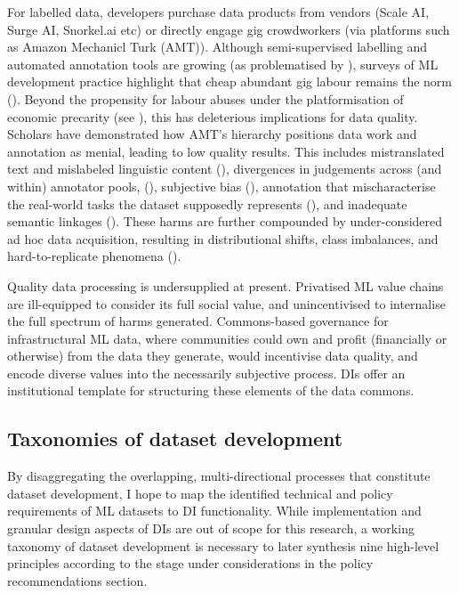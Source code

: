 For labelled data, developers purchase data products from vendors (Scale AI, Surge AI, Snorkel.ai etc) or directly engage gig crowdworkers (via platforms such as Amazon Mechanicl Turk (AMT)). Although semi-supervised labelling and automated annotation tools are growing (as problematised by \textcite{jarrahi2023PrinciplesDataCentricAI}), surveys of ML development practice highlight that cheap abundant gig labour remains the norm (\cite{priestley2023SurveyDataQuality}). Beyond the propensity for labour abuses under the platformisation of economic precarity (see \textcite{miceli2020SubjectivityImpositionPower}), this has deleterious implications for data quality. Scholars have demonstrated how AMT’s hierarchy positions data work and annotation as menial, leading to low quality results. This includes mistranslated text and mislabeled linguistic content (\cite{kreutzer2022QualityGlanceAudit, miceli2020SubjectivityImpositionPower}), divergences in judgements across (and within) annotator pools, (\cite{dixon2018MeasuringMitigatingUnintended, kreutzer2022QualityGlanceAudit}), subjective bias (\cite{ghai2020MeasuringSocialBiases, hube2019UnderstandingMitigatingWorker}), annotation that mischaracterise the real-world tasks the dataset supposedly represents (\cite{dixon2018MeasuringMitigatingUnintended}), and inadequate semantic linkages (\cite{WTFKnowledgeGraph}). These harms are further compounded by under-considered ad hoc data acquisition, resulting in distributional shifts, class imbalances, and hard-to-replicate phenomena (\cite{jarrahi2023PrinciplesDataCentricAI}).

Quality data processing is undersupplied at present. Privatised ML value chains are ill-equipped to consider its full social value, and unincentivised to internalise the full spectrum of harms generated. Commons-based governance for infrastructural ML data, where communities could own and profit (financially or otherwise) from the data they generate, would incentivise data quality, and encode diverse values into the necessarily subjective process. DIs offer an institutional template for structuring these elements of the data commons.

\subsection*{Taxonomies of dataset development}

By disaggregating the overlapping, multi-directional processes that constitute dataset development, I hope to map the identified technical and policy requirements of ML datasets to DI functionality. While implementation and granular design aspects of DIs are out of scope for this research, a working taxonomy of dataset development is necessary to later synthesis nine high-level principles according to the stage under considerations in the policy recommendations section. 


